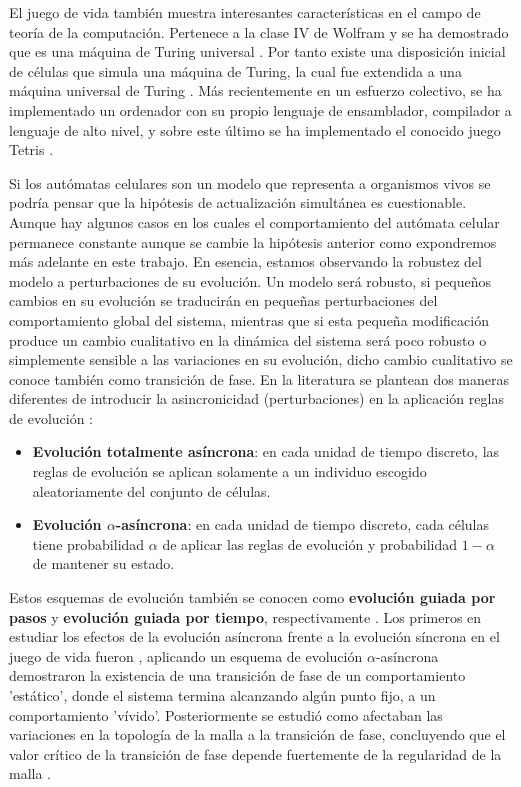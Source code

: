 \documentclass[../proyecto.tex]{book}
\begin{document}
El juego de vida también muestra interesantes características en el campo de teoría de la computación. Pertenece a la clase IV de Wolfram \cite{ccuatro, ccuatro2} y se ha demostrado que es una máquina de Turing universal \cite{turingUniversal}. Por tanto existe una disposición inicial de células que simula una máquina de Turing, la cual fue extendida a una máquina universal de Turing \cite{turing}. Más recientemente en un esfuerzo colectivo, se ha implementado un ordenador con su propio lenguaje de ensamblador, compilador a lenguaje de alto nivel, y sobre este último se ha implementado el conocido juego Tetris \cite{tetris, logical}.

Si los autómatas celulares son un modelo que representa a organismos vivos se podría pensar que la hipótesis de actualización simultánea es cuestionable. Aunque hay algunos casos en los cuales el comportamiento del autómata celular permanece constante aunque se cambie la hipótesis anterior como expondremos más adelante en este trabajo. En esencia, estamos observando la robustez del modelo a perturbaciones de su evolución. Un modelo será robusto, si pequeños cambios en su evolución se traducirán en pequeñas perturbaciones del comportamiento global del sistema, mientras que si esta pequeña modificación produce un cambio cualitativo en la dinámica del sistema será poco robusto o simplemente sensible a las variaciones en su evolución, dicho cambio cualitativo se conoce también como transición de fase. En la literatura se plantean dos maneras diferentes de introducir la asincronicidad (perturbaciones) en la aplicación reglas de evolución \cite{asyncIntro}:
\begin{itemize}
	\item \textbf{Evolución totalmente asíncrona}: en cada unidad de tiempo discreto, las reglas de evolución se aplican solamente a un individuo escogido aleatoriamente del conjunto de células.
	\item \textbf{Evolución $\alpha$-asíncrona}: en cada unidad de tiempo discreto, cada células tiene probabilidad $\alpha$ de aplicar las reglas de evolución y probabilidad $1-\alpha$ de mantener su estado.
\end{itemize}

Estos esquemas de evolución también se conocen como \textbf{evolución guiada por pasos} y \textbf{evolución guiada por tiempo}, respectivamente \cite{aka}. Los primeros en estudiar los efectos de la evolución asíncrona frente a la evolución síncrona en el juego de vida fueron \cite{syncVSasync}, aplicando un esquema de evolución $\alpha$-asíncrona demostraron la existencia de una transición de fase de un comportamiento 'estático', donde el sistema termina alcanzando algún punto fijo, a un comportamiento 'vívido'. Posteriormente se estudió como afectaban las variaciones en la topología de la malla a la transición de fase, concluyendo que el valor crítico de la transición de fase depende fuertemente de la regularidad de la malla \cite{mallaIrregular1, mallaIrregular2}.
\end{document}
